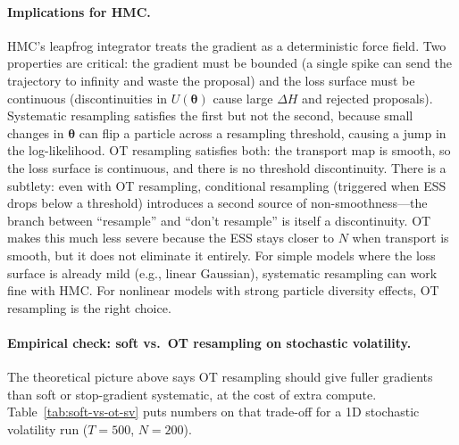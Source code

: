 \documentclass{article}
\renewcommand{\v}[1]{ \ensuremath{ {\mathbf{#1}} }}
\begin{document}
\paragraph{Implications for HMC.}
HMC's leapfrog integrator treats the gradient as a deterministic force field. Two properties are critical: the gradient must be bounded (a single spike can send the trajectory to infinity and waste the proposal) and the loss surface must be continuous (discontinuities in $U(\v\theta)$ cause large $\Delta H$ and rejected proposals). Systematic resampling satisfies the first but not the second, because small changes in $\v\theta$ can flip a particle across a resampling threshold, causing a jump in the log-likelihood. OT resampling satisfies both: the transport map is smooth, so the loss surface is continuous, and there is no threshold discontinuity. There is a subtlety: even with OT resampling, conditional resampling (triggered when ESS drops below a threshold) introduces a second source of non-smoothness---the branch between ``resample'' and ``don't resample'' is itself a discontinuity. OT makes this much less severe because the ESS stays closer to $N$ when transport is smooth, but it does not eliminate it entirely. For simple models where the loss surface is already mild (e.g., linear Gaussian), systematic resampling can work fine with HMC. For nonlinear models with strong particle diversity effects, OT resampling is the right choice.


\paragraph{Empirical check: soft vs.\ OT resampling on stochastic volatility.}
\label{par:soft-vs-ot}
The theoretical picture above says OT resampling should give fuller gradients than soft or stop-gradient systematic, at the cost of extra compute. Table~\ref{tab:soft-vs-ot-sv} puts numbers on that trade-off for a 1D stochastic volatility run ($T = 500$, $N = 200$).
\end{document}
